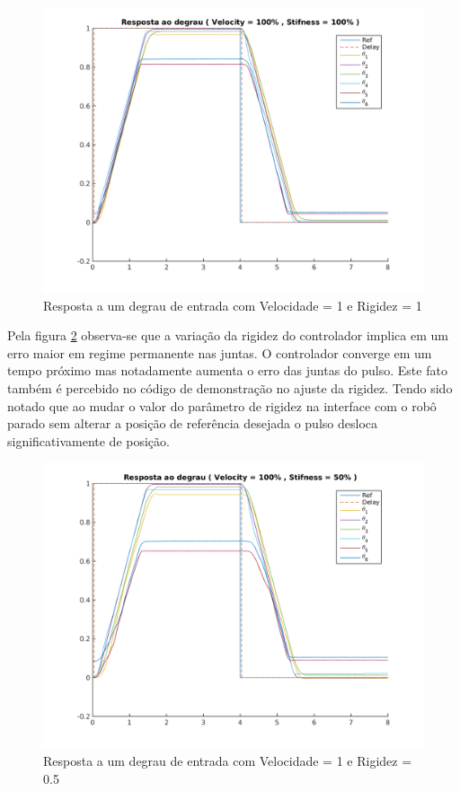\begin{figure}[H]
    \centering
    \includegraphics[width=0.8\linewidth]{tex/figs/jointIdentification_exp1v100v100.png}
    \caption{Resposta a um degrau de entrada com Velocidade = 1 e Rigidez = 1}
    \label{fig:jointIdentification_exp1v100v100}
\end{figure}

Pela figura \ref{fig:jointIdentification_exp2v100v50} observa-se que a variação da rigidez do controlador implica em um erro maior em regime permanente nas juntas. O controlador converge em um tempo próximo mas notadamente aumenta o erro das juntas do pulso. Este fato também é percebido no código de demonstração no ajuste da rigidez. Tendo sido notado que ao mudar o valor do parâmetro de rigidez na interface com o robô parado sem alterar a posição de referência desejada o pulso desloca significativamente de posição.

\begin{figure}[H]
    \centering
    \includegraphics[width=0.8\linewidth]{tex/figs/jointIdentification_exp2v100v50.png}
    \caption{Resposta a um degrau de entrada com Velocidade = 1 e Rigidez = 0.5}
    \label{fig:jointIdentification_exp2v100v50}
\end{figure}

